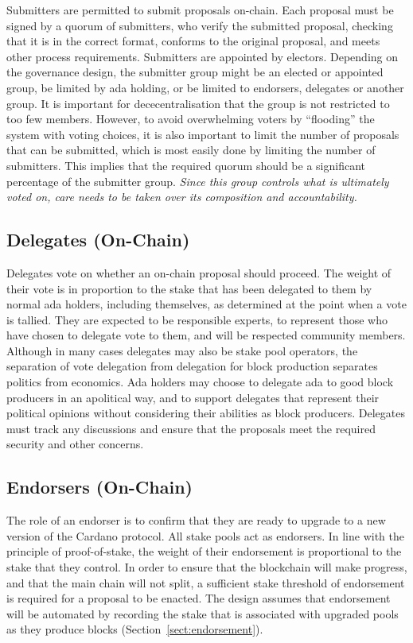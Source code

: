 Submitters are permitted to submit proposals on-chain.  Each proposal must be signed by a quorum of submitters, who verify the submitted
proposal, checking that it is in the correct format, conforms to the original proposal, and meets other process requirements.
Submitters are appointed by electors.  Depending on the governance design, the submitter group might %
be an elected or appointed group, be limited by ada holding, or be limited to endorsers, delegates or another group.
It is important for dececentralisation that the group is not restricted to too few members.
However, to avoid overwhelming voters by ``flooding'' the system with voting choices, it is also important to limit the number of proposals that can
be submitted, which is most easily done by limiting the number of submitters.  This implies that the required quorum should be a significant percentage
of the submitter group.
\emph{Since this group controls what is ultimately voted on, care needs to be taken over its composition and accountability.}

\subsection{Delegates (On-Chain)}

Delegates vote on whether an on-chain proposal should proceed.  The weight of
their vote is in proportion to the stake that has been delegated to them by
normal ada holders, including themselves, as determined at the point when a vote is tallied.
They are expected to be responsible
experts, to represent those who have chosen to delegate vote to them, and will
be respected community members.  Although in many cases delegates may also be
stake pool operators, the separation of vote delegation from delegation for
block production separates politics from economics.  Ada holders may choose to
delegate ada to good block producers in an apolitical way, and to support
delegates that represent their political opinions without considering their abilities as
block producers.  Delegates must track any discussions and ensure that the proposals meet the required
security and other concerns.

\subsection{Endorsers (On-Chain)}

The role of an endorser is to confirm that they are ready to upgrade to a new
version of the Cardano protocol.  All stake pools act as endorsers.  In line with
the principle of proof-of-stake, the weight of their endorsement is proportional
to the stake that they control.  In order to ensure that the blockchain will
make progress, and that the main chain will not split, a sufficient stake
threshold of endorsement is required for a proposal to be enacted.
The design assumes that endorsement will be automated by recording the stake that
is associated with upgraded pools as they produce blocks (Section~\ref{sect:endorsement}).


